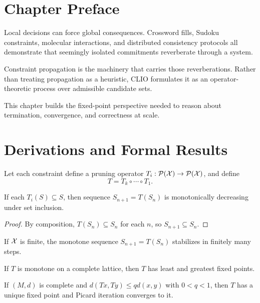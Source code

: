 \section{Chapter Preface}
Local decisions can force global consequences. Crossword fills, Sudoku constraints, molecular interactions, and distributed consistency protocols all demonstrate that seemingly isolated commitments reverberate through a system.

Constraint propagation is the machinery that carries those reverberations. Rather than treating propagation as a heuristic, CLIO formulates it as an operator-theoretic process over admissible candidate sets.

This chapter builds the fixed-point perspective needed to reason about termination, convergence, and correctness at scale.

\section{Derivations and Formal Results}
Let each constraint define a pruning operator \(T_i:\mathcal P(\mathcal{X})\to\mathcal P(\mathcal{X})\), and define
\[
T=T_k\circ\cdots\circ T_1.
\]

\begin{proposition}
If each \(T_i(S)\subseteq S\), then sequence \(S_{n+1}=T(S_n)\) is monotonically decreasing under set inclusion.
\end{proposition}

\begin{proof}
By composition, \(T(S_n)\subseteq S_n\) for each \(n\), so \(S_{n+1}\subseteq S_n\).
\end{proof}

\begin{proposition}
If \(\mathcal{X}\) is finite, the monotone sequence \(S_{n+1}=T(S_n)\) stabilizes in finitely many steps.
\end{proposition}

\begin{theorem}
If \(T\) is monotone on a complete lattice, then \(T\) has least and greatest fixed points.
\end{theorem}

\begin{theorem}
If \((M,d)\) is complete and \(d(Tx,Ty)\le qd(x,y)\) with \(0<q<1\), then \(T\) has a unique fixed point and Picard iteration converges to it.
\end{theorem}
